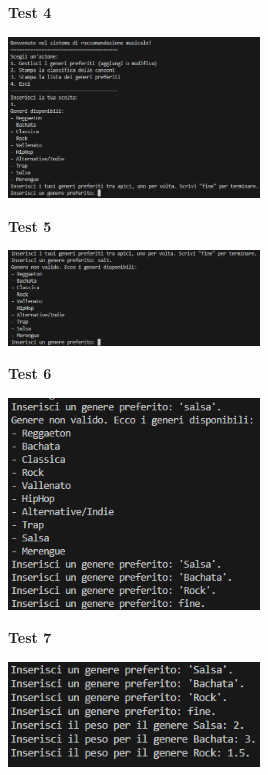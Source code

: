 \documentclass[a4paper,11pt]{article}
\begin{document}
\newpage
\begin{center}
    \textbf{Test 4}
    \par
    \vspace{0.5cm}
    \includegraphics[width=0.5\textwidth]{ptest4}
\end{center}
\begin{center}
    \textbf{Test 5}
    \par
    \vspace{0.5cm}
    \includegraphics[width=0.5\textwidth]{ptest5}
\end{center}
\begin{center}
    \textbf{Test 6}
    \par
    \vspace{0.5cm}
    \includegraphics[width=0.5\textwidth]{ptest6}
\end{center}
\begin{center}
    \textbf{Test 7}
    \par
    \vspace{0.5cm}
    \includegraphics[width=0.5\textwidth]{ptest7}
\end{center}
\end{document}
